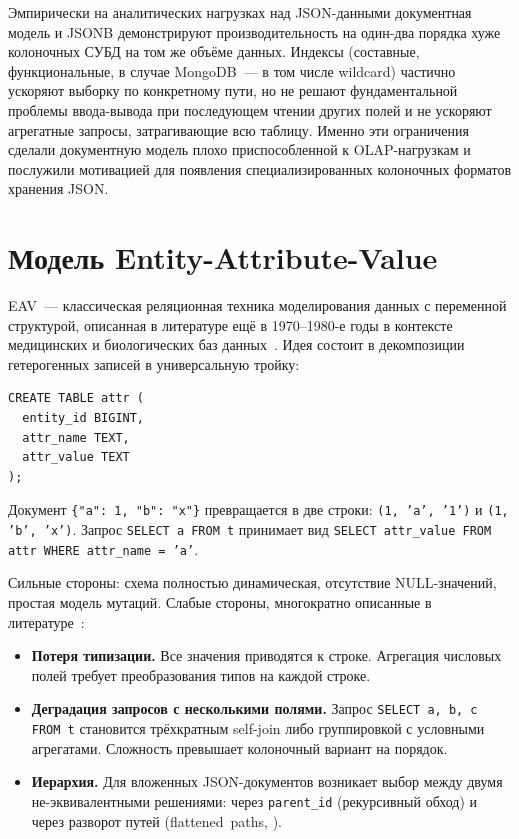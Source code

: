 Эмпирически на аналитических нагрузках над JSON-данными
документная модель и JSONB демонстрируют производительность на
один-два порядка хуже колоночных СУБД на том же объёме данных.
Индексы (составные, функциональные, в случае MongoDB~--- в том
числе wildcard) частично ускоряют выборку по конкретному пути, но
не решают фундаментальной проблемы ввода-вывода при последующем
чтении других полей и не ускоряют агрегатные запросы,
затрагивающие всю таблицу. Именно эти ограничения сделали
документную модель плохо приспособленной к OLAP-нагрузкам и
послужили мотивацией для появления специализированных колоночных
форматов хранения JSON.

\section{Модель Entity-Attribute-Value}

EAV~--- классическая реляционная техника моделирования данных с
переменной структурой, описанная в литературе ещё в 1970--1980-е
годы в контексте медицинских и биологических баз
данных~\cite{stead1983,nadkarni2007}. Идея состоит в декомпозиции
гетерогенных записей в универсальную тройку:
\begin{verbatim}
CREATE TABLE attr (
  entity_id BIGINT,
  attr_name TEXT,
  attr_value TEXT
);
\end{verbatim}

Документ \texttt{\{"a":~1, "b":~"x"\}} превращается в две строки:
\texttt{(1, 'a', '1')} и \texttt{(1, 'b', 'x')}. Запрос
\texttt{SELECT a FROM t} принимает вид
\texttt{SELECT attr\_value FROM attr WHERE attr\_name~=~'a'}.

Сильные стороны: схема полностью динамическая, отсутствие
NULL-значений, простая модель мутаций. Слабые стороны, многократно
описанные в литературе~\cite{dinu2007}:

\begin{itemize}
    \item \textbf{Потеря типизации.} Все значения приводятся к
    строке. Агрегация числовых полей требует преобразования типов
    на каждой строке.
    \item \textbf{Деградация запросов с несколькими полями.} Запрос
    \texttt{SELECT a, b, c FROM t} становится трёхкратным
    self-join либо группировкой с условными агрегатами. Сложность
    превышает колоночный вариант на порядок.
    \item \textbf{Иерархия.} Для вложенных JSON-документов
    возникает выбор между двумя не-эквивалентными решениями:
    через \texttt{parent\_id} (рекурсивный обход) и через
    разворот путей (flattened~paths, \cite{beyer2005,florescu1999}).
\end{itemize}

